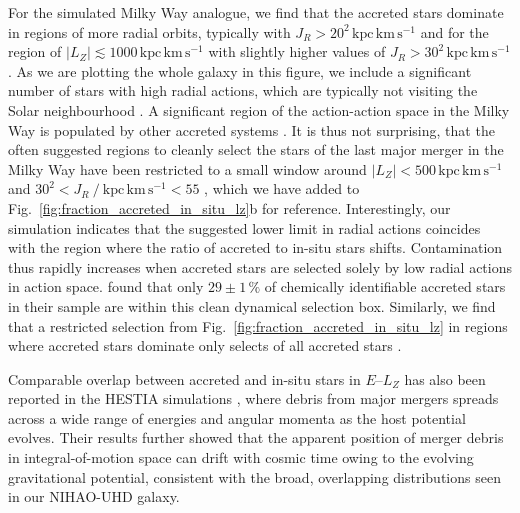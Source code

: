 \documentclass[fleqn,usenatbib]{mnras}
\newcommand{\changed}[1]{{{#1}}}
\begin{document}
For the simulated Milky Way analogue, we find that the accreted stars dominate in regions of more radial orbits, typically with $J_R > 20^2\,\mathrm{kpc\,km\,s^{-1}}$ and for the region of $\vert L_Z \vert \lesssim 1000\,\mathrm{kpc\,km\,s^{-1}}$ with slightly higher values of $J_R > 30^2\,\mathrm{kpc\,km\,s^{-1}}$ . As we are plotting the whole galaxy in this figure, we include a significant \changed{number} of stars with high radial actions, which are typically not visiting the Solar neighbourhood \citep[compare Figs.~\ref{fig:lz_e_jr}e and \ref{fig:lz_e_jr}f and see for example][]{Feuillet2019}. A significant region of the action-action space in the Milky Way is populated by other accreted systems \citep[for example][]{Myeong2019, Naidu2020}. It is thus not surprising, that the often suggested regions to cleanly select the stars of the last major merger in the Milky Way have been restricted to a small window around $\vert L_Z \vert < 500\,\mathrm{kpc\,km\,s^{-1}}$ and $30^2 < J_R~/~\mathrm{kpc\,km\,s^{-1}} < 55$ \citep{Feuillet2021, Buder2022}, which we have added to Fig.~\ref{fig:fraction_accreted_in_situ_lz}b for reference. Interestingly, our simulation indicates that the suggested lower limit in radial actions coincides with the region where the ratio of accreted to in-situ stars shifts. Contamination thus rapidly increases when accreted stars are selected solely by low radial actions in action space. \citet{Buder2022} found that only $29 \pm 1\,\mathrm{\%}$ of chemically identifiable accreted stars in their sample are within this clean dynamical selection box. Similarly, we find that a restricted selection from Fig.~\ref{fig:fraction_accreted_in_situ_lz} in regions where accreted stars dominate only selects  of all accreted stars \citep[for a study of other selection criteria and their purity as well as completeness see][]{Carrillo2024}.

\changed{Comparable overlap between accreted and in-situ stars in $E$–$L_Z$ has also been reported in the HESTIA simulations \citep{Khoperskov2023b}, where debris from major mergers spreads across a wide range of energies and angular momenta as the host potential evolves. Their results further showed that the apparent position of merger debris in integral-of-motion space can drift with cosmic time owing to the evolving gravitational potential, consistent with the broad, overlapping distributions seen in our NIHAO-UHD galaxy.}
\end{document}
